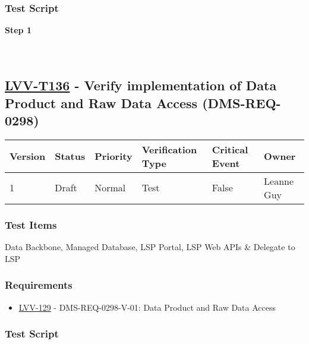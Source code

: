 \hypertarget{test-script-112}{%
\subsubsection{Test Script}\label{test-script-112}}

\textbf{Step 1}\\
~\\
~\\

\hypertarget{lvv-t136---verify-implementation-of-data-product-and-raw-data-access-dms-req-0298}{%
\subsection{\texorpdfstring{\href{https://jira.lsstcorp.org/secure/Tests.jspa\#/testCase/LVV-T136}{LVV-T136}
- Verify implementation of Data Product and Raw Data Access
(DMS-REQ-0298)}{LVV-T136 - Verify implementation of Data Product and Raw Data Access (DMS-REQ-0298)}}\label{lvv-t136---verify-implementation-of-data-product-and-raw-data-access-dms-req-0298}}

\begin{longtable}[]{@{}llllll@{}}
\toprule
Version & Status & Priority & Verification Type & Critical Event &
Owner\tabularnewline
\midrule
\endhead
1 & Draft & Normal & Test & False & Leanne Guy\tabularnewline
\bottomrule
\end{longtable}

\hypertarget{test-items-112}{%
\subsubsection{Test Items}\label{test-items-112}}

Data Backbone, Managed Database, LSP Portal, LSP Web APIs \& Delegate to
LSP

\hypertarget{requirements-113}{%
\subsubsection{Requirements}\label{requirements-113}}

\begin{itemize}
\tightlist
\item
  \href{https://jira.lsstcorp.org/browse/LVV-129}{LVV-129} -
  DMS-REQ-0298-V-01: Data Product and Raw Data Access
\end{itemize}

\hypertarget{test-script-113}{%
\subsubsection{Test Script}\label{test-script-113}}

